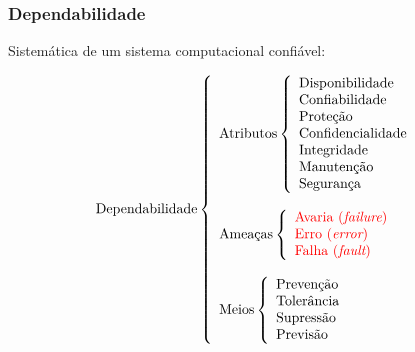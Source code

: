 \documentclass{beamer}
\begin{document}
\begin{frame}
    \frametitle{Dependabilidade}

    Sistemática de um sistema computacional confiável:

\begin{figure}[htb]
\centering
\footnotesize
\[
\text{Dependabilidade}
\left\{
\begin{array}{l}
\text{Atributos}
    \left\{
    \begin{array}{l}
        \text{Disponibilidade}\\
        \text{Confiabilidade}\\
        \text{Proteção}\\
        \text{Confidencialidade}\\
        \text{Integridade}\\
        \text{Manutenção}\\
        \text{Segurança}
    \end{array}
    \right.
\\
\\
\text{Ameaças}
    \left\{
    \begin{array}{l}
        \text{\color{red} Avaria ({\it failure})}\\
        \text{\color{red} Erro ({\it error})}\\
        \text{\color{red} Falha ({\it fault})}
    \end{array}
    \right.
\\
\\
\text{Meios}
    \left\{
    \begin{array}{l}
        \text{Prevenção}\\
        \text{Tolerância}\\
        \text{Supressão}\\
        \text{Previsão}
    \end{array}
    \right.
\end{array}
\right.
\]
\end{figure}

\end{frame}

\end{document}
